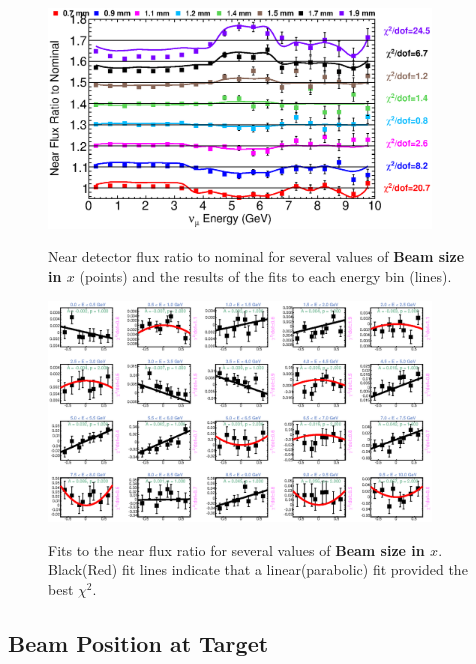 \begin{figure}[ht]
  \begin{center}
    {\includegraphics[width=4.0in]{figures/BeamSigmaX_near_summary.eps}}
  \end{center}
\caption{ Near detector flux ratio to nominal for several values of {\bf Beam size in $x$} (points) and the results of the fits to each energy bin (lines).}
\end{figure}

\begin{figure}[hb]
  \begin{center}
    {\includegraphics[width=4.0in]{figures/BeamSigmaY_near_fits.eps}}
  \end{center}
\caption{ Fits to the near flux ratio for several values of {\bf Beam size in $x$}. Black(Red) fit lines indicate that a linear(parabolic) fit provided the best $\chi^2$. }
\end{figure}

\subsection{Beam Position at Target}


